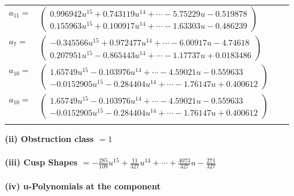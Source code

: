\documentclass[1p]{elsarticle_modified}
\theoremstyle{definition}
\begin{document}
\begin{tabular}{m{7pt} m{180pt} m{7pt} m{180pt} }
\flushright $a_{11}=$&$\begin{pmatrix}0.996942 u^{15}+0.743119 u^{14}+\cdots-5.75229 u-0.519878\\0.155963 u^{15}+0.100917 u^{14}+\cdots-1.63303 u-0.486239\end{pmatrix}$ \\
\flushright $a_{7}=$&$\begin{pmatrix}-0.345566 u^{15}+0.972477 u^{14}+\cdots-6.00917 u-4.74618\\0.207951 u^{15}-0.865443 u^{14}+\cdots-1.17737 u+0.0183486\end{pmatrix}$ \\
\flushright $a_{10}=$&$\begin{pmatrix}1.65749 u^{15}-0.103976 u^{14}+\cdots-4.59021 u-0.559633\\-0.0152905 u^{15}-0.284404 u^{14}+\cdots-1.76147 u+0.400612\end{pmatrix}$\\ \flushright $a_{10}=$&$\begin{pmatrix}1.65749 u^{15}-0.103976 u^{14}+\cdots-4.59021 u-0.559633\\-0.0152905 u^{15}-0.284404 u^{14}+\cdots-1.76147 u+0.400612\end{pmatrix}$\\&\end{tabular}
\flushleft \textbf{(ii) Obstruction class $= 1$}\\~\\
\flushleft \textbf{(iii) Cusp Shapes $= -\frac{285}{109} u^{15}+\frac{11}{327} u^{14}+\cdots+\frac{4073}{327} u-\frac{271}{327}$}\\~\\
\newpage\renewcommand{\arraystretch}{1}
\flushleft \textbf{(iv) u-Polynomials at the component}\newline \\
\end{document}

